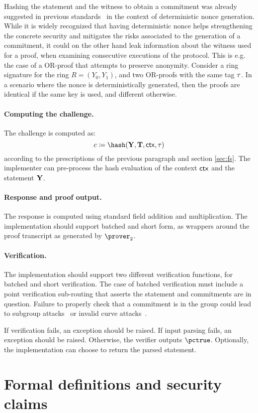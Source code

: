\documentclass[runningheads,11pt]{article}
\begin{document}
Hashing the statement and the witness to obtain a commitment was already suggested in previous standards~\cite{rfc6979} in the context of deterministic nonce generation.
While it is widely recognized that having deterministic nonce helps strengthening the concrete security  and mitigates the risks associated to the generation of a commitment, it could on the other hand leak information about the witness used for a proof, when examining consecutive executions of the protocol. This is e.g. the case of a OR-proof that attempts to preserve anonymity.
Consider a ring signature for the ring \(R = (Y_0 , Y_1)\),
and two OR-proofs with the same tag $\tau$.  In a scenario where the nonce is deterministically generated, then the proofs are identical if the same key is used, and different otherwise.

\paragraph{Computing the challenge.}
The challenge is computed as:
\[
  c \defeq \hash(\vec \statement, \vec \commitment, \ctx, \stag)
\]
according to the prescriptions of the previous paragraph and section \cref{sec:fs}. The implementer can pre-process the hash evaluation of the context $\mathsf{ctx}$ and the statement $\mathbf {Y}$.

\paragraph{Response and proof output.} The response is computed using standard field addition and multiplication. The implementation should support batched and short form, as wrappers around the proof transcript as generated by $\prover_2$.
\paragraph{Verification.} The implementation should support two different verification functions, for batched and short verification.
The case of batched verification must include a point verification sub-routing that asserts the statement and commitments are in question. Failure to properly check that a commitment is in the group could lead to subgroup attacks~\cite{EC:VanWie96,C:LimLee97} or invalid curve attacks~\cite{C:BieMeyMul00,RSA:BBPV12}.

If verification fails, an exception should be raised.
If input parsing fails, an exception should be raised.
Otherwise, the verifier outputs $\pctrue$. Optionally, the implementation can choose to return the parsed statement.





%

\appendix
\section{Formal definitions and security claims}
\end{document}
